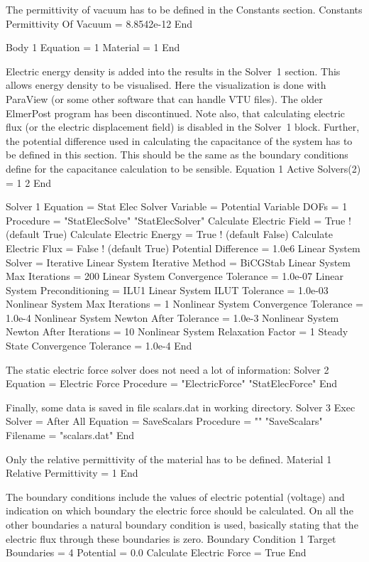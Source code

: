 The permittivity of vacuum has to be defined in the Constants section.
\ttbegin
Constants
  Permittivity Of Vacuum = 8.8542e-12
End

Body 1
  Equation = 1
  Material = 1
End
\ttend

Electric energy density is added into the results in the Solver~1
section. This allows energy density to be visualised.
Here the visualization is done with ParaView (or some other software that
can handle VTU files). The older ElmerPost program has been discontinued.
Note also, that calculating electric flux (or the electric
displacement field) is disabled in the Solver~1 block. Further, the
potential difference used in calculating the capacitance of the system
has to be defined in this section. This should be the same as the
boundary conditions define for the capacitance calculation to be
sensible.
\ttbegin
Equation 1
  Active Solvers(2) = 1 2
End

Solver 1
  Equation = Stat Elec Solver
  Variable = Potential
  Variable DOFs = 1
  Procedure = "StatElecSolve" "StatElecSolver"
  Calculate Electric Field = True  ! (default True)
  Calculate Electric Energy = True  ! (default False)
  Calculate Electric Flux = False  ! (default True)
  Potential Difference = 1.0e6
  Linear System Solver = Iterative
  Linear System Iterative Method = BiCGStab
  Linear System Max Iterations = 200
  Linear System Convergence Tolerance = 1.0e-07
  Linear System Preconditioning = ILU1
  Linear System ILUT Tolerance = 1.0e-03
  Nonlinear System Max Iterations = 1
  Nonlinear System Convergence Tolerance = 1.0e-4
  Nonlinear System Newton After Tolerance = 1.0e-3
  Nonlinear System Newton After Iterations = 10
  Nonlinear System Relaxation Factor = 1
  Steady State Convergence Tolerance = 1.0e-4
End
\ttend

The static electric force solver does not need a lot of information:
\ttbegin
Solver 2
  Equation = Electric Force
  Procedure = "ElectricForce" "StatElecForce"
End
\ttend

Finally, some data is saved in file scalars.dat in working directory.
\ttbegin
Solver 3
  Exec Solver = After All
  Equation = SaveScalars
  Procedure = "" "SaveScalars"
  Filename = "scalars.dat"
End
\ttend

Only the relative permittivity of the material has to be defined.
\ttbegin
Material 1
  Relative Permittivity = 1
End
\ttend

The boundary conditions include the values of electric potential
(voltage) and indication on which boundary the electric force should
be calculated. On all the other boundaries a natural boundary
condition is used, basically stating that the electric flux through
these boundaries is zero.
\ttbegin
Boundary Condition 1
  Target Boundaries = 4
  Potential = 0.0
  Calculate Electric Force = True
End


